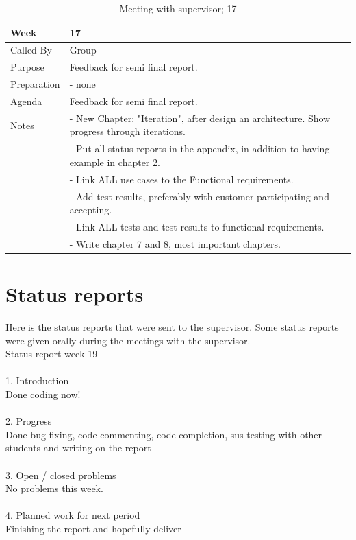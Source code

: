 {\footnotesize
\begin{table}[H]
\begin{tabular}{| p{5cm} | p{10cm} |}\hline
	\textbf{Week}	& \textbf{17} \\ \hline
	Called	By		& Group\\ \hline
	Purpose		& Feedback for semi final report.\\ \hline
	Preparation 
		& - none\\ 
		
	Agenda
		& Feedback for semi final report. \\

	Notes	& - New Chapter: "Iteration", after design an architecture. Show progress through iterations.\\
& - Put all status reports in the appendix, in addition to having example in chapter 2.\\
& - Link ALL use cases to the Functional requirements.\\
& - Add test results, preferably with customer participating and accepting.\\
& - Link ALL tests and test results to functional requirements.\\
& - Write chapter 7 and 8, most important chapters.\\ \hline
	
\end{tabular}


\caption{Meeting with supervisor; 17}
\label{fig:s_meeting_17}
\end{table}}

\section*{Status reports}

Here is the status reports that were sent to the supervisor. Some status reports were given orally during the meetings with the supervisor. \\

\noindent Status report week 19\\
\\
1. Introduction\\
Done coding now!\\
\\
2. Progress\\
Done bug fixing, code commenting, code completion, sus testing with other students and writing on the report\\
\\
3. Open / closed problems\\
No problems this week.\\
\\
4. Planned work for next period\\
Finishing the report and hopefully deliver\\

